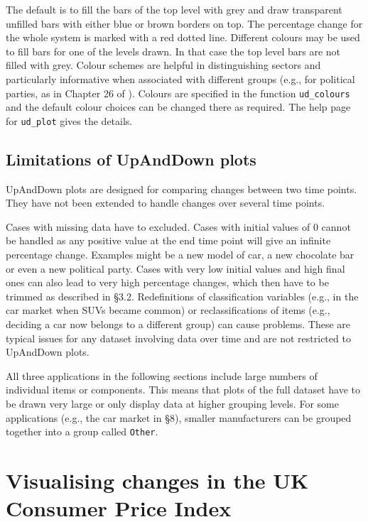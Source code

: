 The default is to fill the bars of the top level with grey and draw transparent unfilled bars with either blue or brown borders on top. The percentage change for the whole system is marked with a red dotted line. Different colours may be used to fill bars for one of the levels drawn. In that case the top level bars are not filled with grey. Colour schemes are helpful in distinguishing sectors and particularly informative when associated with different groups (e.g., for political parties, as in Chapter 26 of \citet{unwin:2024}). Colours are specified in the function \texttt{ud\_colours} and the default colour choices can be changed there as required. The help page for \texttt{ud\_plot} gives the details.

\hypertarget{limitations-of-upanddown-plots}{%
\subsection{Limitations of UpAndDown plots}\label{limitations-of-upanddown-plots}}

UpAndDown plots are designed for comparing changes between two time points. They have not been extended to handle changes over several time points.

Cases with missing data have to excluded. Cases with initial values of \(0\) cannot be handled as any positive value at the end time point will give an infinite percentage change. Examples might be a new model of car, a new chocolate bar or even a new political party. Cases with very low initial values and high final ones can also lead to very high percentage changes, which then have to be trimmed as described in §3.2. Redefinitions of classification variables (e.g., in the car market when SUVs became common) or reclassifications of items (e.g., deciding a car now belongs to a different group) can cause problems. These are typical issues for any dataset involving data over time and are not restricted to UpAndDown plots.

All three applications in the following sections include large numbers of individual items or components. This means that plots of the full dataset have to be drawn very large or only display data at higher grouping levels. For some applications (e.g., the car market in §8), smaller manufacturers can be grouped together into a group called \texttt{Other}.

\hypertarget{visualising-changes-in-the-uk-consumer-price-index}{%
\section{Visualising changes in the UK Consumer Price Index}\label{visualising-changes-in-the-uk-consumer-price-index}}

